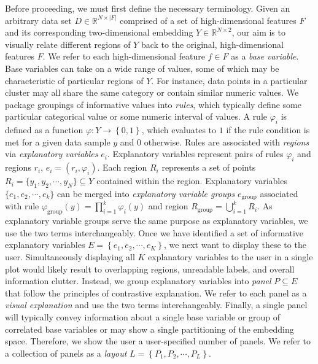 \documentclass[lettersize,journal]{IEEEtran}
\begin{document}
Before proceeding, we must first define the necessary terminology. 
Given an arbitrary data set $D \in \mathbb{R}^{N \times |F|}$ comprised of a set of high-dimensional features $F$ and its corresponding two-dimensional embedding $Y \in \mathbb{R}^{N \times 2}$, our aim is to visually relate different regions of $Y$ back to the original, high-dimensional features $F$.
We refer to each high-dimensional feature $f \in F$ as a \textit{base variable}.
Base variables can take on a wide range of values, some of which may be characteristic of particular regions of $Y$. For instance, data points in a particular cluster may all share the same category or contain similar numeric values.
We package groupings of informative values into \textit{rules}, which typically define some particular categorical value or some numeric interval of values.
A rule $\varphi_i$ is defined as a function $\varphi: Y \rightarrow \left \{ 0, 1
\right \} $, which evaluates to $1$ if the rule condition is met for a given data sample $y$ and $0$ otherwise.
Rules are associated with \textit{regions} via \textit{explanatory variables} $e_i$. Explanatory variables represent pairs of rules $\varphi_i$ and regions $r_i$, $e_i = \left ( r_i, \varphi_i \right )$.
Each region $R_i$ represents a set of points $R_i = \{ y_1, y_2, \cdots, y_N \} \subseteq Y$ contained within the region.
Explanatory variables $\{ e_1, e_2, \cdots, e_k \}$ can be merged into \textit{explanatory variable groups} $e_{\text{group}}$ associated with rule $\varphi_{\text{group}}(y) = \prod_{i=1}^k \varphi_i(y)$ and region $R_{\text{group}} = \bigcup_{i=1}^{k} R_i$. As explanatory variable groups serve the same purpose as explanatory variables, we use the two terms interchangeably.
Once we have identified a set of informative explanatory variables $E = \left \{ e_1, e_2, \cdots, e_K \right \}$, we next want to display these to the user. Simultaneously displaying all $K$ explanatory variables to the user in a single plot would likely result to overlapping regions, unreadable labels, and overall information clutter.
Instead, we group explanatory variables into \textit{panel} $P \subseteq E$ that follow the principles of contrastive explanation. We refer to each panel as a \textit{visual explanation} and use the two terms interchangeably.
Finally, a single panel will typically convey information about a single base variable or group of correlated base variables or may show a single partitioning of the embedding space.
Therefore, we show the user a user-specified number of panels. We refer to a collection of panels as a \textit{layout} $L = \left \{ P_1, P_2, \cdots, P_L \right \}$.
\end{document}
